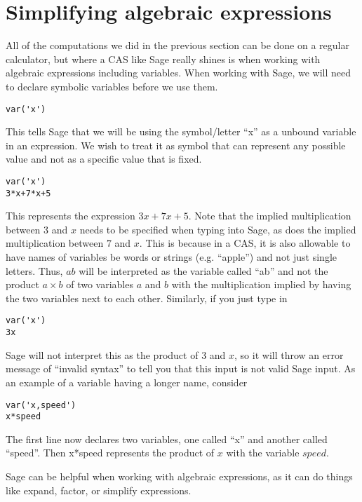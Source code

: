 \section{Simplifying algebraic expressions}

All of the computations we did in the previous section can be
done on a regular calculator, but where a CAS like Sage really
shines is when working with algebraic expressions including
variables. When working with Sage, we will need to declare
symbolic variables before we use them.

\begin{verbatim}
var('x')
\end{verbatim}

This tells Sage that we will be using the symbol/letter ``x'' as a
unbound variable in an expression. We wish to treat it as symbol
that can represent any possible value and not as a specific
value that is fixed.

\begin{verbatim}
var('x')
3*x+7*x+5
\end{verbatim}

This represents the expression $3x+7x+5$. Note that the implied
multiplication between $3$ and $x$ needs to be specified when
typing into Sage, as does the implied multiplication between
$7$ and $x$. This is because in a CAS, it is also allowable to
have names of variables be words or strings (e.g. ``apple'') and not just
single letters. Thus, $ab$ will be interpreted as the variable called
``ab'' and not the product $a \times b$ of two variables $a$ and $b$
with the multiplication implied by having the two variables next to
each other. Similarly, if you just type in

\begin{verbatim}
var('x')
3x
\end{verbatim}

Sage will not interpret this as the product of $3$ and $x$, so it
will throw an error message of ``invalid syntax'' to tell you that this
input is not valid Sage input. As an example of a variable having
a longer name, consider

\begin{verbatim}
var('x,speed')
x*speed
\end{verbatim}

The first line now declares two variables, one called ``x'' and another
called ``speed''. Then x*speed represents the product of $x$ with the variable
$speed$.

Sage can be helpful when working with algebraic expressions, as
it can do things like expand, factor, or simplify expressions.

